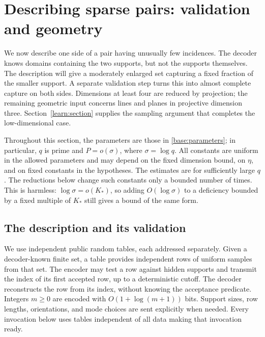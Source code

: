 \section{Describing sparse pairs: validation and geometry}
\label{geom:section}

We now describe one side of a pair having unusually few incidences. The
decoder knows domains containing the two supports, but not the supports
themselves. The description will give a moderately enlarged set capturing
a fixed fraction of the smaller support. A separate validation step turns
this into almost complete capture on both sides. Dimensions at least four
are reduced by projection; the remaining geometric input concerns lines
and planes in projective dimension three. Section~\ref{learn:section}
supplies the sampling argument that completes the low-dimensional case.

Throughout this section, the parameters are those in
\eqref{base:parameters}; in particular, $q$ is prime and $P=o(\sigma)$,
where $\sigma=\log q$. All constants are uniform in the allowed parameters
and may depend on the fixed dimension bound, on $\eta$, and on fixed
constants in the hypotheses. The estimates are for sufficiently large
$q$. The reductions below change such constants only a bounded number of
times. This is harmless: $\log\sigma=o(K_*)$, so adding
$O(\log\sigma)$ to a deficiency bounded by a fixed multiple of $K_*$
still gives a bound of the same form.

\subsection{The description and its validation}

We use independent public random tables, each addressed separately. Given
a decoder-known finite set, a table provides independent rows of uniform
samples from that set. The encoder may test a row against hidden supports
and transmit the index of its first accepted row, up to a deterministic
cutoff. The decoder reconstructs the row from its index, without knowing
the acceptance predicate. Integers $m\geq 0$ are encoded with
$O(1+\log(m+1))$ bits. Support sizes, row lengths, orientations, and mode
choices are sent explicitly when needed. Every invocation below uses
tables independent of all data making that invocation ready.


